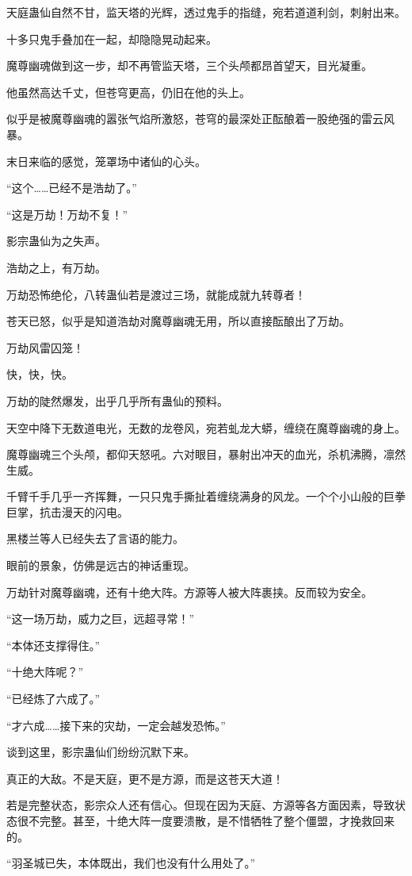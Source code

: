 \begin{this_body}
天庭蛊仙自然不甘，监天塔的光辉，透过鬼手的指缝，宛若道道利剑，刺射出来。

十多只鬼手叠加在一起，却隐隐晃动起来。

魔尊幽魂做到这一步，却不再管监天塔，三个头颅都昂首望天，目光凝重。

他虽然高达千丈，但苍穹更高，仍旧在他的头上。

似乎是被魔尊幽魂的嚣张气焰所激怒，苍穹的最深处正酝酿着一股绝强的雷云风暴。

末日来临的感觉，笼罩场中诸仙的心头。

“这个……已经不是浩劫了。”

“这是万劫！万劫不复！”

影宗蛊仙为之失声。

浩劫之上，有万劫。

万劫恐怖绝伦，八转蛊仙若是渡过三场，就能成就九转尊者！

苍天已怒，似乎是知道浩劫对魔尊幽魂无用，所以直接酝酿出了万劫。

万劫风雷囚笼！

快，快，快。

万劫的陡然爆发，出乎几乎所有蛊仙的预料。

天空中降下无数道电光，无数的龙卷风，宛若虬龙大蟒，缠绕在魔尊幽魂的身上。

魔尊幽魂三个头颅，都仰天怒吼。六对眼目，暴射出冲天的血光，杀机沸腾，凛然生威。

千臂千手几乎一齐挥舞，一只只鬼手撕扯着缠绕满身的风龙。一个个小山般的巨拳巨掌，抗击漫天的闪电。

黑楼兰等人已经失去了言语的能力。

眼前的景象，仿佛是远古的神话重现。

万劫针对魔尊幽魂，还有十绝大阵。方源等人被大阵裹挟。反而较为安全。

“这一场万劫，威力之巨，远超寻常！”

“本体还支撑得住。”

“十绝大阵呢？”

“已经炼了六成了。”

“才六成……接下来的灾劫，一定会越发恐怖。”

谈到这里，影宗蛊仙们纷纷沉默下来。

真正的大敌。不是天庭，更不是方源，而是这苍天大道！

若是完整状态，影宗众人还有信心。但现在因为天庭、方源等各方面因素，导致状态很不完整。甚至，十绝大阵一度要溃散，是不惜牺牲了整个僵盟，才挽救回来的。

“羽圣城已失，本体既出，我们也没有什么用处了。”


\end{this_body}
